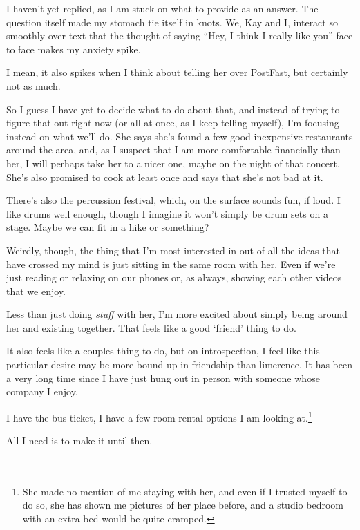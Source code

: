 I haven't yet replied, as I am stuck on what to provide as an answer. The question itself made my stomach tie itself in knots. We, Kay and I, interact so smoothly over text that the thought of saying ``Hey, I think I really like you'' face to face makes my anxiety spike.

I mean, it also spikes when I think about telling her over PostFast, but certainly not as much.

So I guess I have yet to decide what to do about that, and instead of trying to figure that out right now (or all at once, as I keep telling myself), I'm focusing instead on what we'll do. She says she's found a few good inexpensive restaurants around the area, and, as I suspect that I am more comfortable financially than her, I will perhaps take her to a nicer one, maybe on the night of that concert. She's also promised to cook at least once and says that she's not bad at it.

There's also the percussion festival, which, on the surface sounds fun, if loud. I like drums well enough, though I imagine it won't simply be drum sets on a stage. Maybe we can fit in a hike or something?

Weirdly, though, the thing that I'm most interested in out of all the ideas that have crossed my mind is just sitting in the same room with her. Even if we're just reading or relaxing on our phones or, as always, showing each other videos that we enjoy.

Less than just doing \emph{stuff} with her, I'm more excited about simply being around her and existing together. That feels like a good `friend' thing to do.

It also feels like a couples thing to do, but on introspection, I feel like this particular desire may be more bound up in friendship than limerence. It has been a very long time since I have just hung out in person with someone whose company I enjoy.

I have the bus ticket, I have a few room-rental options I am looking at.\footnote{She made no mention of me staying with her, and even if I trusted myself to do so, she has shown me pictures of her place before, and a studio bedroom with an extra bed would be quite cramped.}

All I need is to make it until then.

\section{}

